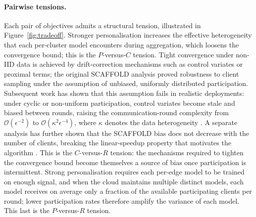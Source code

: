 \paragraph{Pairwise tensions.}
Each pair of objectives admits a structural tension, illustrated in Figure~\ref{fig:tradeoff}. Stronger personalisation increases the effective heterogeneity that each per-cluster model encounters during aggregation, which loosens the convergence bound; this is the $P$-versus-$C$ tension. Tight convergence under non-IID data is achieved by drift-correction mechanisms such as control variates or proximal terms; the original SCAFFOLD analysis \cite{karimireddy2020scaffold} proved robustness to client sampling under the assumption of unbiased, uniformly distributed participation. Subsequent work has shown that this assumption fails in realistic deployments: under cyclic or non-uniform participation, control variates become stale and biased between rounds, raising the communication-round complexity from $\mathcal{O}(\epsilon^{-2})$ to $\mathcal{O}(\kappa^{2} \epsilon^{-4})$, where $\kappa$ denotes the data heterogeneity \cite{crawshaw2024periodic}. A separate analysis has further shown that the SCAFFOLD bias does not decrease with the number of clients, breaking the linear-speedup property that motivates the algorithm \cite{mangold2025scaffold}. This is the $C$-versus-$R$ tension: the mechanisms required to tighten the convergence bound become themselves a source of bias once participation is intermittent. Strong personalisation requires each per-edge model to be trained on enough signal, and when the cloud maintains multiple distinct models, each model receives on average only a fraction of the available participating clients per round; lower participation rates therefore amplify the variance of each model. This last is the $P$-versus-$R$ tension.

